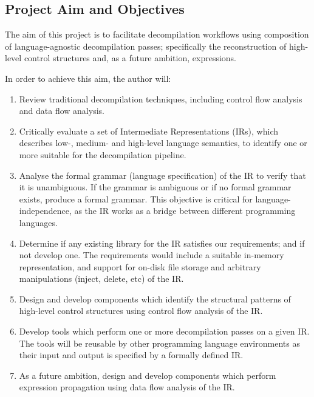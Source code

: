 \documentclass[12pt, a4paper]{article}
\begin{document}
\pagebreak %


\subsection{Project Aim and Objectives}

The aim of this project is to facilitate decompilation workflows using composition of language-agnostic decompilation passes; specifically the reconstruction of high-level control structures and, as a future ambition, expressions.

In order to achieve this aim, the author will:
\begin{enumerate}
	\item Review traditional decompilation techniques, including control flow analysis and data flow analysis. \label{obj_review_decomp}
	\item Critically evaluate a set of Intermediate Representations (IRs), which describes low-, medium- and high-level language semantics, to identify one or more suitable for the decompilation pipeline. \label{obj_review_suitable_ir}
	\item Analyse the formal grammar (language specification) of the IR to verify that it is unambiguous. If the grammar is ambiguous or if no formal grammar exists, produce a formal grammar. This objective is critical for language-independence, as the IR works as a bridge between different programming languages. \label{obj_formal_ir}
	\item Determine if any existing library for the IR satisfies our requirements; and if not develop one. The requirements would include a suitable in-memory representation, and support for on-disk file storage and arbitrary manipulations (inject, delete, etc) of the IR. \label{obj_ir_library}
	\item Design and develop components which identify the structural patterns of high-level control structures using control flow analysis of the IR. \label{obj_structural_analysis_library}
	\item Develop tools which perform one or more decompilation passes on a given IR. The tools will be reusable by other programming language environments as their input and output is specified by a formally defined IR. \label{obj_structural_analysis_tool}
	\item As a future ambition, design and develop components which perform expression propagation using data flow analysis of the IR. \label{obj_data_analysis_library}
\end{enumerate}
\end{document}
